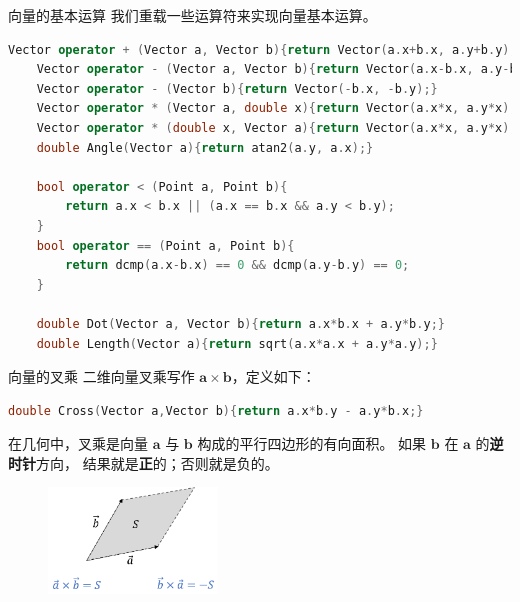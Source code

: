 \documentclass{beamer}
\begin{document}
\begin{frame}[fragile]{向量的基本运算}
    我们重载一些运算符来实现向量基本运算。
\begin{lstlisting}[language=c++]
    Vector operator + (Vector a, Vector b){return Vector(a.x+b.x, a.y+b.y);}
    Vector operator - (Vector a, Vector b){return Vector(a.x-b.x, a.y-b.y);}
    Vector operator - (Vector b){return Vector(-b.x, -b.y);}
    Vector operator * (Vector a, double x){return Vector(a.x*x, a.y*x);}
    Vector operator * (double x, Vector a){return Vector(a.x*x, a.y*x);}
    double Angle(Vector a){return atan2(a.y, a.x);}

    bool operator < (Point a, Point b){
        return a.x < b.x || (a.x == b.x && a.y < b.y);
    }
    bool operator == (Point a, Point b){
        return dcmp(a.x-b.x) == 0 && dcmp(a.y-b.y) == 0;
    }

    double Dot(Vector a, Vector b){return a.x*b.x + a.y*b.y;}
    double Length(Vector a){return sqrt(a.x*a.x + a.y*a.y);}
\end{lstlisting}
\end{frame}


\begin{frame}[fragile]{向量的叉乘}
    二维向量叉乘写作 $\mathbf{a}\times \mathbf{b}$，定义如下：
\begin{lstlisting}[language=c++]
    double Cross(Vector a,Vector b){return a.x*b.y - a.y*b.x;}
\end{lstlisting}

    \vspace{1em}\pause
    在几何中，叉乘是向量 $\mathbf{a}$ 与 $\mathbf{b}$ 构成的平行四边形的有向面积。
    如果 $\mathbf{b}$ 在 $\mathbf{a}$ 的\textbf{逆时针}方向，
    结果就是\textbf{正}的；否则就是负的。

    \begin{figure}
        \centering
        \includegraphics[width=0.4\textwidth]{pic/cross.png}
    \end{figure}
\end{frame}
\end{document}
